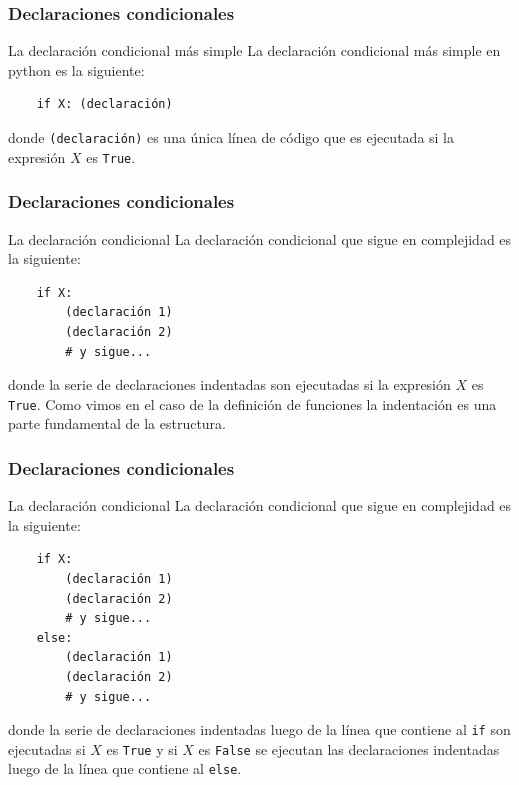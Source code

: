 \documentclass{beamer}
\begin{document}
\begin{frame}[fragile]
    \frametitle{Declaraciones condicionales}
    \begin{block}{La declaración condicional más simple}
    La declaración condicional más simple en python es la siguiente:
    \begin{verbatim}
    if X: (declaración)
    \end{verbatim}
    donde \texttt{(declaración)} es una única línea de código que es ejecutada si la expresión $X$ es \texttt{True}.
    \end{block}

    \end{frame}

\begin{frame}[fragile]
    \frametitle{Declaraciones condicionales}

    \begin{block}{La declaración condicional}
        La declaración condicional que sigue en complejidad es la siguiente:

        \begin{verbatim}
    if X: 
        (declaración 1)
        (declaración 2)
        # y sigue...
        \end{verbatim}

        donde la serie de declaraciones indentadas son ejecutadas si la expresión $X$ es \texttt{True}. Como vimos en el caso de la
        definición de funciones la \alert{indentación} es una parte fundamental de la estructura.
        \end{block}
    \end{frame}


\begin{frame}[fragile]
    \frametitle{Declaraciones condicionales}
    \begin{block}{La declaración condicional}
        La declaración condicional que sigue en complejidad es la siguiente:
        \begin{verbatim}
    if X: 
        (declaración 1)
        (declaración 2)
        # y sigue...
    else:
        (declaración 1)
        (declaración 2)
        # y sigue...
        \end{verbatim}
        donde la serie de declaraciones indentadas luego de la línea que contiene al \texttt{if}
        son ejecutadas si $X$ es \texttt{True} y si $X$ es \texttt{False} se ejecutan
        las declaraciones indentadas luego de la línea que contiene al \texttt{else}.
        \end{block}
    \end{frame}
\end{document}
